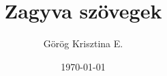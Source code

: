 \documentclass{book}
\title{Zagyva szövegek}
\author{Görög Krisztina E.}
\date{\today}
\begin{document}
\maketitle
{}
\foreignlanguage{english}{
\blindtext}

\frenchspacing

\hulipsum[1]


\foreignlanguage{latin}{\lipsum[1]}
\end{document}
